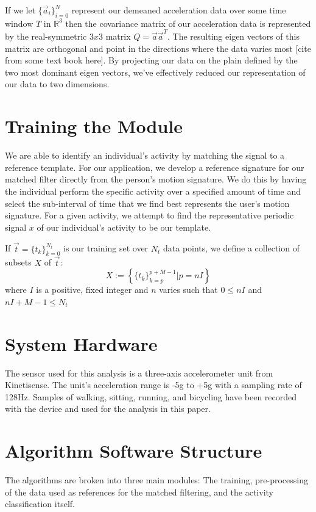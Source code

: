 \documentclass[journal]{IEEEtran}
\begin{document}
If we let $\{\vec{a}_i\}_{i=0}^{N}$ represent our demeaned acceleration data over some time window $T$ in $\mathbb{R}^3$ then the covariance matrix of our acceleration data is represented by the real-symmetric $3x3$ matrix $Q = \vec{a} \vec{a}^T$.
The resulting eigen vectors of this matrix are orthogonal and point in the directions where the data varies most [cite from some text book here].
By projecting our data on the plain defined by the two most dominant eigen vectors, we've effectively reduced our representation of our data to two dimensions.
%
\section{Training the Module}
We are able to identify an individual\textquotesingle's activity by matching the signal to a reference template.
For our application, we develop a reference signature for our matched filter directly from the person\textquotesingle’s motion signature.
We do this by having the individual perform the specific activity over a specified amount of time and select the sub-interval of time that we find best represents the user's motion signature.
For a given activity, we attempt to find the representative periodic signal $x$ of our individual’s activity to be our template.

If $\vec{t} = \{t_k\}_{k=0}^{N_t}$ is our training set over $N_t$ data points, we define a collection of subsets $X$ of $\vec{t}$:
%
\begin{equation} \label{subsets_of_training_eq}
X := \left \{ \{t_k\}_{k=p}^{p+M-1} | p=nI \right \}
\end{equation}
%
where $I$ is a positive, fixed integer and $n$ varies such that $0 \leq nI$ and $nI + M - 1 \leq N_t$
%
\section{System Hardware}
The sensor used for this analysis is a three-axis accelerometer unit from Kinetisense.
The unit’s acceleration range is -5g to +5g with a sampling rate of 128Hz.
Samples of walking, sitting, running, and bicycling have been recorded with the device and used for the analysis in this paper.
%
\section{Algorithm Software Structure}
%
The algorithms are broken into three main modules: The training, pre-processing of the data used as references for the matched filtering, and the activity classification itself.
\end{document}
